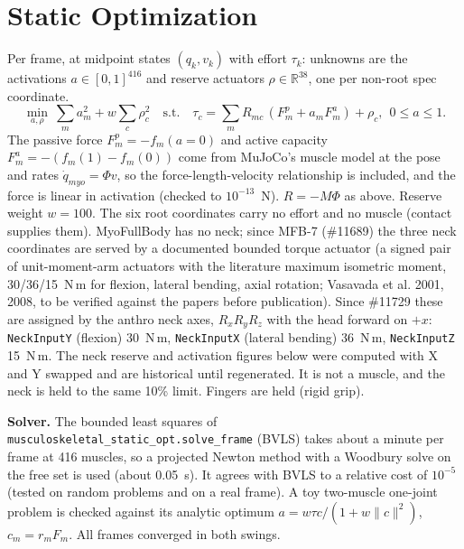 \documentclass[11pt,a4paper]{article}
\begin{document}
\section{Static Optimization}
Per frame, at midpoint states $(q_k,v_k)$ with effort $\tau_k$: unknowns are the activations $a\in[0,1]^{416}$ and reserve actuators $\rho\in\mathbb{R}^{38}$, one per non-root spec coordinate.
\begin{equation}
\min_{a,\rho}\ \sum_m a_m^2+w\sum_c\rho_c^2\quad\text{s.t.}\quad \tau_c=\sum_m R_{mc}\,(F^{p}_m+a_m F^{a}_m)+\rho_c,\ \ 0\le a\le 1 .
\end{equation}
The passive force $F^p_m=-f_m(a{=}0)$ and active capacity $F^a_m=-(f_m(1)-f_m(0))$ come from MuJoCo's muscle model at the pose and rates $\dot q_{myo}=\Phi v$, so the force-length-velocity relationship is included, and the force is linear in activation (checked to $10^{-13}$~N). $R=-M\Phi$ as above. Reserve weight $w=100$. The six root coordinates carry no effort and no muscle (contact supplies them). MyoFullBody has no neck; since MFB-7 (\#11689) the three neck coordinates are served by a documented bounded torque actuator (a signed pair of unit-moment-arm actuators with the literature maximum isometric moment, 30/36/15~N\,m for flexion, lateral bending, axial rotation; Vasavada et al. 2001, 2008, to be verified against the papers before publication). Since \#11729 these are assigned by the anthro neck axes, $R_x R_y R_z$ with the head forward on $+x$: \texttt{NeckInputY} (flexion) 30~N\,m, \texttt{NeckInputX} (lateral bending) 36~N\,m, \texttt{NeckInputZ} 15~N\,m. The neck reserve and activation figures below were computed with X and Y swapped and are historical until regenerated. It is not a muscle, and the neck is held to the same 10\% limit. Fingers are held (rigid grip).

\textbf{Solver.} The bounded least squares of \texttt{musculoskeletal\_static\_opt.solve\_frame} (BVLS) takes about a minute per frame at 416 muscles, so a projected Newton method with a Woodbury solve on the free set is used (about 0.05~s). It agrees with BVLS to a relative cost of $10^{-5}$ (tested on random problems and on a real frame). A toy two-muscle one-joint problem is checked against its analytic optimum $a=w\tau c/(1+w\|c\|^2)$, $c_m=r_mF_m$. All frames converged in both swings.
\end{document}
